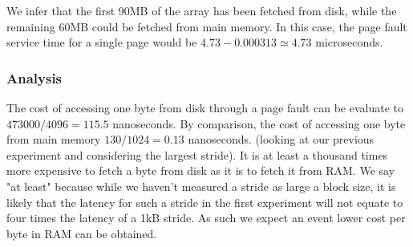 We infer that the first 90MB of the array has been fetched from disk, while the remaining 60MB could be fetched from main memory. In this case, the page fault service time for a single page would be $4.73-0.000313 \simeq 4.73$ microseconds.

\subsubsection{Analysis}

The cost of accessing one byte from disk through a page fault can be evaluate to $473000 / 4096 = 115.5$ nanoseconds. By comparison, the cost of accessing one byte from main memory $130/1024 = 0.13$ nanoseconds. (looking at our previous experiment and considering the largest stride). It is at least a thousand times more expensive to fetch a byte from disk as it is to fetch it from RAM. We say "at least" because while we haven't measured a stride as large a block size, it is likely that the latency for such a stride in the first experiment  will not equate to four times the latency of a 1kB stride.  As such we expect an event lower cost per byte in RAM can be obtained.